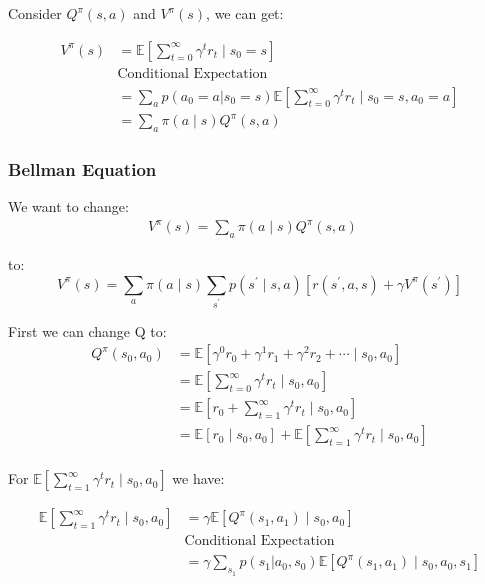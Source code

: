 \documentclass[11pt]{article}
\begin{document}
Consider $Q^{\pi}(s, a)$ and $V^{\pi}(s)$, we can get:

\begin{align*}
V^{\pi}(s) &=\mathbb{E}\left[\sum_{t=0}^{\infty} \gamma^{t} r_{t} \mid s_{0}=s\right] \\
&\text{Conditional Expectation} \\
&=\sum_{a}p(a_0=a | s_0=s) \mathbb{E}\left[\sum_{t=0}^{\infty} \gamma^{t} r_{t} \mid s_{0}=s ,a_0=a\right] \\
&=\sum_{a} \pi(a \mid s) Q^{\pi}(s, a) \quad
\end{align*}



\subsubsection{Bellman Equation}

We want to change:
\begin{align*}
V^{\pi}(s) =\sum_{a} \pi(a \mid s) Q^{\pi}(s, a) \quad
\end{align*}

to:
\begin{equation}
V^{\pi}(s)=\sum_{a} \pi(a \mid s) \sum_{s^{\prime}} p\left(s^{\prime} \mid s, a\right)\left[r\left(s^{\prime}, a, s\right)+\gamma V^{\pi}\left(s^{\prime}\right)\right]
\end{equation}

First we can change Q to:
\begin{align*}
Q^{\pi}\left(s_{0}, a_{0}\right) &=\mathbb{E}\left[\gamma^{0} r_{0}+\gamma^{1} r_{1}+\gamma^{2} r_{2}+\cdots \mid s_{0}, a_{0}\right] \\
&=\mathbb{E}\left[\sum_{t=0}^{\infty} \gamma^{t} r_{t} \mid s_{0}, a_{0}\right] \\
&=\mathbb{E}\left[r_{0}+\sum_{t=1}^{\infty} \gamma^{t} r_{t} \mid s_{0}, a_{0}\right] \\
&=\mathbb{E}\left[r_{0} \mid s_{0}, a_{0}\right] + \mathbb{E}\left[\sum_{t=1}^{\infty} \gamma^{t} r_{t} \mid s_{0}, a_{0}\right] \\
\end{align*}

For $\mathbb{E}\left[\sum_{t=1}^{\infty} \gamma^{t} r_{t} \mid s_{0}, a_{0}\right]$ we have:

\begin{align*}
\mathbb{E}\left[\sum_{t=1}^{\infty} \gamma^{t} r_{t} \mid s_{0}, a_{0}\right] &= \gamma\mathbb{E}\left[Q^\pi (s_1, a_1) \mid s_{0}, a_{0}\right] \\
&\text{Conditional Expectation} \\
&= \gamma\sum_{s_1} p(s_1 | a_0, s_0) \mathbb{E}\left[Q^\pi (s_1, a_1) \mid s_{0}, a_{0}, s_{1}\right]
\end{align*}
\end{document}
